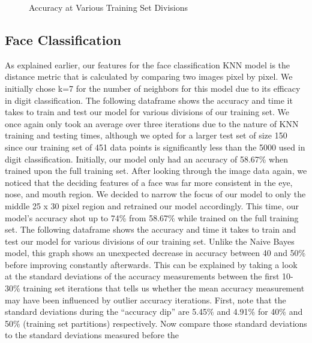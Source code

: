 \documentclass[10pt,parskip=half,
toc=sectionentrywithdots,
bibliography=totocnumbered,
captions=tableheading,numbers=noendperiod]{scrartcl}
\begin{document}
\begin{figure}[H]\begin{center}\end{center}\caption{Accuracy at Various Training Set Divisions}\label{fig:flabel}\end{figure}

\hypertarget{face-classification}{%
\subsection{Face Classification}\label{face-classification}}

As explained earlier, our features for the face classification KNN model
is the distance metric that is calculated by comparing two images pixel
by pixel. We initially chose k=7 for the number of neighbors for this
model due to its efficacy in digit classification. The following
dataframe shows the accuracy and time it takes to train and test our
model for various divisions of our training set. We once again only took
an average over three iterations due to the nature of KNN training and
testing times, although we opted for a larger test set of size 150 since
our training set of 451 data points is significantly less than the 5000
used in digit classification. Initially, our model only had an accuracy
of 58.67\% when trained upon the full training set. After looking
through the image data again, we noticed that the deciding features of a
face was far more consistent in the eye, nose, and mouth region. We
decided to narrow the focus of our model to only the middle 25 x 30
pixel region and retrained our model accordingly. This time, our model's
accuracy shot up to 74\% from 58.67\% while trained on the full training
set. The following dataframe shows the accuracy and time it takes to
train and test our model for various divisions of our training set.
Unlike the Naive Bayes model, this graph shows an unexpected decrease in
accuracy between 40 and 50\% before improving constantly afterwards.
This can be explained by taking a look at the standard deviations of the
accuracy measurements between the first 10-30\% training set iterations
that tells us whether the mean accuracy measurement may have been
influenced by outlier accuracy iterations. First, note that the standard
deviations during the ``accuracy dip'' are 5.45\% and 4.91\% for 40\%
and 50\% (training set partitions) respectively. Now compare those
standard deviations to the standard deviations measured before the
\end{document}
